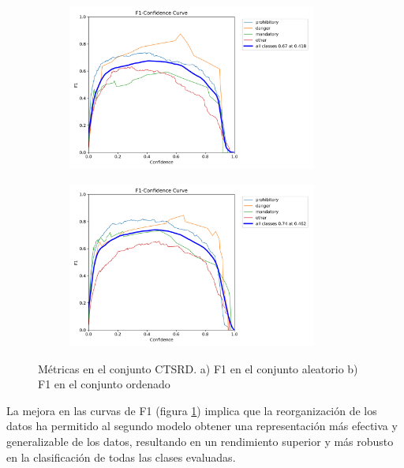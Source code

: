 \documentclass{article}
\begin{document}
\begin{figure}[h]
\begin{subfigure}[b]{0.5\textwidth}
\centering
\includegraphics[width=0.9\textwidth]{resources/random cuban F1 curve.png}
\caption{}
\end{subfigure}
\begin{subfigure}[b]{0.5\textwidth}
\centering
\includegraphics[width=0.9\textwidth]{resources/sim cuban F1 curve.png}
\caption{}
\end{subfigure}
\caption{Métricas en el conjunto CTSRD. a) F1 en el conjunto aleatorio b) F1 en el conjunto ordenado}
\label{fig:f1 random vs f1 sim}
\end{figure}

La mejora en las curvas de F1 (figura \ref{fig:f1 random vs f1 sim}) implica que la reorganización de los datos ha permitido al segundo modelo obtener una representación más efectiva y generalizable de los datos, resultando en un rendimiento superior y más robusto en la clasificación de todas las clases evaluadas.
\end{document}
